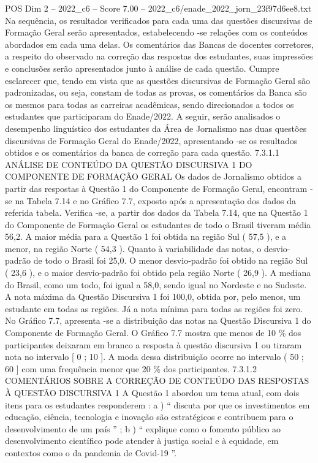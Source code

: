 \begin{textsample}{POS Dim 2 – 2022\_c6 – Score 7.00 – 2022\_c6/enade\_2022\_jorn\_23f97d6ee8.txt}
Na sequência, os resultados verificados para cada uma das questões discursivas de Formação Geral serão apresentados, estabelecendo -se relações com os conteúdos abordados em cada uma delas.
Os comentários das Bancas de docentes corretores, a respeito do observado na correção das respostas dos estudantes, suas impressões e conclusões serão apresentados junto à análise de cada questão.
Cumpre esclarecer que, tendo em vista que as questões discursivas de Formação Geral são padronizadas, ou seja, constam de todas as provas, os comentários da Banca são os mesmos para todas as carreiras acadêmicas, sendo direcionados a todos os estudantes que participaram do Enade/2022.
A seguir, serão analisados o desempenho linguístico dos estudantes da Área de Jornalismo nas duas questões discursivas de Formação Geral do Enade/2022, apresentando -se os resultados obtidos e os comentários da banca de correção para cada questão. 7.3.1.1 ANÁLISE DE CONTEÚDO DA QUESTÃO DISCURSIVA 1 DO COMPONENTE DE FORMAÇÃO GERAL Os dados de Jornalismo obtidos a partir das respostas à Questão 1 do Componente de Formação Geral, encontram -se na Tabela 7.14 e no Gráfico 7.7, exposto após a apresentação dos dados da referida tabela.
Verifica -se, a partir dos dados da Tabela 7.14, que na Questão 1 do Componente de Formação Geral os estudantes de todo o Brasil tiveram média 56,2.
A maior média para a Questão 1 foi obtida na região Sul ( 57,5 ), e a menor, na região Norte ( 54,3 ).
Quanto à variabilidade das notas, o desvio-padrão de todo o Brasil foi 25,0.
O menor desvio-padrão foi obtido na região Sul ( 23,6 ), e o maior desvio-padrão foi obtido pela região Norte ( 26,9 ).
A mediana do Brasil, como um todo, foi igual a 58,0, sendo igual no Nordeste e no Sudeste.
A nota máxima da Questão Discursiva 1 foi 100,0, obtida por, pelo menos, um estudante em todas as regiões.
Já a nota mínima para todas as regiões foi zero.
No Gráfico 7.7, apresenta -se a distribuição das notas na Questão Discursiva 1 do Componente de Formação Geral.
O Gráfico 7.7 mostra que menos de 10 \% dos participantes deixaram em branco a resposta à questão discursiva 1 ou tiraram nota no intervalo [ 0 ; 10 ].
A moda dessa distribuição ocorre no intervalo ( 50 ; 60 ] com uma frequência menor que 20 \% dos participantes. 7.3.1.2 COMENTÁRIOS SOBRE A CORREÇÃO DE CONTEÚDO DAS RESPOSTAS À QUESTÃO DISCURSIVA 1 A Questão 1 abordou um tema atual, com dois itens para os estudantes responderem : a ) “ discuta por que os investimentos em educação, ciência, tecnologia e inovação são estratégicos e contribuem para o desenvolvimento de um país ” ; b ) “ explique como o fomento público ao desenvolvimento científico pode atender à justiça social e à equidade, em contextos como o da pandemia de Covid-19 ”.

\end{textsample}
